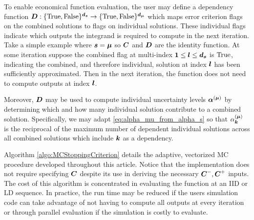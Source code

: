 \documentclass{article}[12pt]
\begin{document}
To enable economical function evaluation, the user may define a dependency function $\boldsymbol{D}: \{\text{True},\text{False}\}^{\boldsymbol{d}_{\boldsymbol{s}}} \to \{\text{True},\text{False}\}^{\boldsymbol{d}_{\boldsymbol{\mu}}}$ which maps error criterion flags on the combined solutions to flags on individual solutions. These individual flags indicate which outputs the integrand is required to compute in the next iteration. Take a simple example where  $\boldsymbol{s}=\boldsymbol{\mu}$ so $\boldsymbol{C}$ and $\boldsymbol{D}$ are the identity function. At some iteration suppose the combined flag at multi-index $\boldsymbol{1} \leq \boldsymbol{l} \leq \boldsymbol{d}_{\boldsymbol{s}}$ is $\text{True}$, indicating the combined, and therefore individual, solution at index $\boldsymbol{l}$ has been sufficiently approximated. Then in the next iteration, the function does not need to compute outputs at index $\boldsymbol{l}$.

Moreover, $\boldsymbol{D}$ may be used to compute individual uncertainty levels $\boldsymbol{\alpha}^{(\boldsymbol{\mu})}$ by determining which and how many individual solution contribute to a combined solution. Specifically, we may adapt \eqref{eq:alpha_mu_from_alpha_s} so that 
$\alpha_{\boldsymbol{k}}^{(\boldsymbol{\mu})}$ is the reciprocal of the maximum number of dependent individual solutions across all combined solutions which include $\boldsymbol{k}$ as a dependency.

Algorithm \ref{algo:MCStoppingCriterion} details the adaptive, vectorized MC procedure developed throughout this article. Notice that the implementation does not require specifying $\boldsymbol{C}$ despite its use in deriving the necessary $\boldsymbol{C}^-,\boldsymbol{C}^+$ inputs. The cost of this algorithm is concentrated in evaluating the function at an IID or LD sequence. In practice, the run time may be reduced if the users simulation code can take advantage of not having to compute all outputs at every iteration or through parallel evaluation if the simulation is costly to evaluate.
\end{document}
